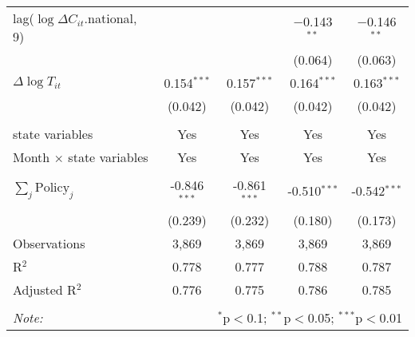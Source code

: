 \begin{tabular}{@{\extracolsep{1pt}}lcccc}
  lag($\log \Delta C_{it}$.national, 9) &  &  & $-$0.143$^{**}$ & $-$0.146$^{**}$ \\ 
  &  &  & (0.064) & (0.063) \\ 
  $\Delta \log T_{it}$ & 0.154$^{***}$ & 0.157$^{***}$ & 0.164$^{***}$ & 0.163$^{***}$ \\ 
  & (0.042) & (0.042) & (0.042) & (0.042) \\ 
 \hline \\[-1.8ex] 
state variables & Yes & Yes & Yes & Yes \\ 
Month $\times$ state variables & Yes & Yes & Yes & Yes \\ 
\hline \\[-1.8ex] 
$\sum_j \mathrm{Policy}_j$ & -0.846$^{***}$ & -0.861$^{***}$ & -0.510$^{***}$ & -0.542$^{***}$ \\ 
 & (0.239) & (0.232) & (0.180) & (0.173) \\ 
Observations & 3,869 & 3,869 & 3,869 & 3,869 \\ 
R$^{2}$ & 0.778 & 0.777 & 0.788 & 0.787 \\ 
Adjusted R$^{2}$ & 0.776 & 0.775 & 0.786 & 0.785 \\ 
\hline 
\hline \\[-1.8ex] 
\textit{Note:}  & \multicolumn{4}{r}{$^{*}$p$<$0.1; $^{**}$p$<$0.05; $^{***}$p$<$0.01} \\ 
\end{tabular} 